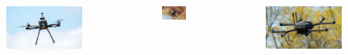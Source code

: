 \documentclass[aspectratio=169]{beamer}
\begin{document}
\begin{frame}
\begin{columns}[c]
    \vspace{-1em}

    \begin{figure}
      \centering
      \includegraphics[width=1.0\textwidth]{./fig/uavs/t690_real.jpg}
    \end{figure}


    \begin{figure}
      \centering
      \includegraphics[width=1.0\textwidth]{./fig/uavs/naki_real.jpg}
    \end{figure}

    \vspace{-1em}

    \begin{figure}
      \centering
      \includegraphics[width=1.0\textwidth]{./fig/uavs/eagle_real.jpg}
    \end{figure}


\end{columns}
\end{frame}
\end{document}
